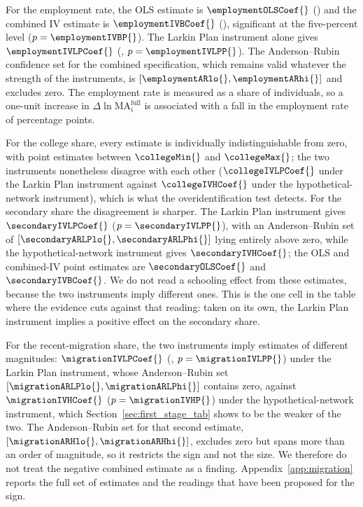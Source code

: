 For the employment rate, the OLS estimate is $\employmentOLSCoef{}$
(\employmentOLSSE{}) and the combined IV estimate is
$\employmentIVBCoef{}$ (\employmentIVBSE{}), significant at the
five-percent level ($p=\employmentIVBP{}$). The Larkin Plan instrument
alone gives $\employmentIVLPCoef{}$ (\employmentIVLPSE{},
$p=\employmentIVLPP{}$). The Anderson--Rubin confidence set for the
combined specification, which remains valid whatever the strength of
the instruments, is $[\employmentARlo{}, \employmentARhi{}]$ and
excludes zero. The employment rate is measured as a share of
individuals, so a one-unit increase in $\Delta \ln
\mathrm{MA}^{\mathrm{full}}_i$ is associated with a fall in the
employment rate of \employmentIVBCoefPP{} percentage points.

For the college share, every estimate is individually
indistinguishable from zero, with point estimates between
$\collegeMin{}$ and $\collegeMax{}$; the two instruments nonetheless
disagree with each other ($\collegeIVLPCoef{}$ under the Larkin Plan
instrument against $\collegeIVHCoef{}$ under the hypothetical-network
instrument), which is what the overidentification test detects. For
the secondary share the disagreement is sharper. The Larkin Plan
instrument gives $\secondaryIVLPCoef{}$ ($p=\secondaryIVLPP{}$), with an
Anderson--Rubin set of $[\secondaryARLPlo{}, \secondaryARLPhi{}]$
lying entirely above zero, while the hypothetical-network instrument
gives $\secondaryIVHCoef{}$; the OLS and combined-IV point estimates are
$\secondaryOLSCoef{}$ and $\secondaryIVBCoef{}$. We do not read a
schooling effect from these estimates, because the two instruments
imply different ones. This is the one cell in the table where the
evidence cuts against that reading: taken on its own, the Larkin Plan
instrument implies a positive effect on the secondary share.

For the recent-migration share, the two instruments imply estimates of
different magnitudes: $\migrationIVLPCoef{}$ (\migrationIVLPSE{},
$p=\migrationIVLPP{}$) under the Larkin Plan instrument, whose
Anderson--Rubin set $[\migrationARLPlo{}, \migrationARLPhi{}]$
contains zero, against $\migrationIVHCoef{}$
($p=\migrationIVHP{}$) under the hypothetical-network instrument,
which Section~\ref{sec:first_stage_tab} shows to be the weaker of the
two. The Anderson--Rubin set for that second estimate,
$[\migrationARHlo{}, \migrationARHhi{}]$, excludes zero but spans
more than an order of magnitude, so it restricts the sign and not the
size. We therefore do not treat the negative combined estimate as a
finding. Appendix~\ref{app:migration} reports the full set of
estimates and the readings that have been proposed for the sign.

